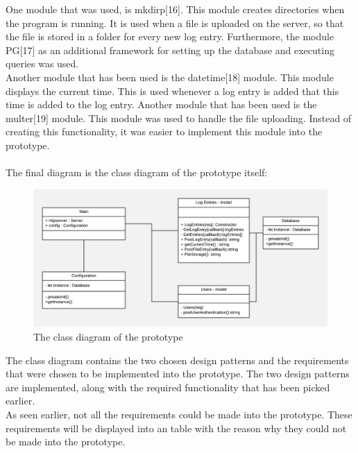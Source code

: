 \documentclass[paper=a4, fontsize=11pt,twoside]{scrartcl}	%
\begin{document}
One module that was used, is mkdirp[16]. This module creates directories when the program is running. It is used when a file is uploaded on the server, so that the file is stored in a folder for every new log entry. Furthermore, the module PG[17] as an additional framework for setting up the database and executing queries was used. \\ Another module that has been used is the datetime[18] module. This module displays the current time. This is used whenever a log entry is added that this time is added to the log entry. Another module that has been used is the multer[19] module. This module was used to handle the file uploading. Instead of creating this functionality, it was easier to implement this module into the prototype. \\  
\\The final diagram is the class diagram of the prototype itself:
\begin{figure}[H]
\includegraphics[scale=0.9]{class_diagram}
\caption{The class diagram of the prototype}
\end{figure}
\noindent
The class diagram contains the two chosen design patterns and the requirements that were chosen to be implemented into the prototype. The two design patterns are implemented, along with the required functionality that has been picked earlier.\\
As seen earlier, not all the requirements could be made into the prototype. These requirements will be displayed into an table with the reason why they could not be made into the prototype.
\newpage
\end{document}
